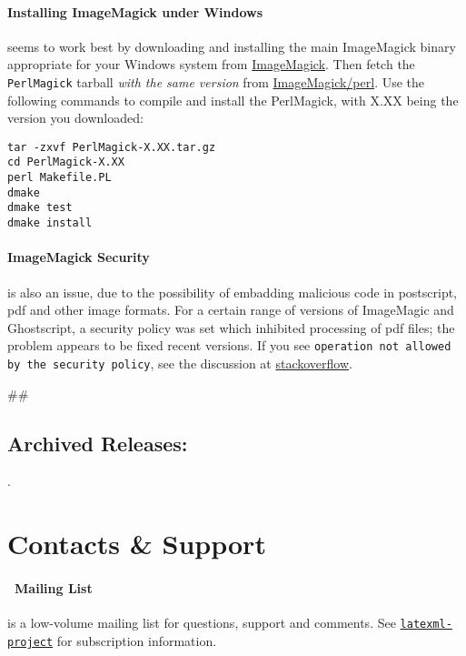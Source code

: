 \documentclass{article}
\begin{document}
\paragraph*{Installing ImageMagick under Windows}\label{get.windows.imagemagick}
seems to work best by downloading and installing the main ImageMagick binary
appropriate for your Windows system
from \href{https://imagemagick.org/script/binary-releases.php#windows}{ImageMagick}.
Then fetch the \texttt{PerlMagick} tarball \emph{with the same version} from
\href{https://imagemagick.com/download/perl/}{ImageMagick/perl}.
Use the following commands to compile and install the PerlMagick,
with X.XX being the version you downloaded:
\begin{lstlisting}[style=shell]
tar -zxvf PerlMagick-X.XX.tar.gz
cd PerlMagick-X.XX
perl Makefile.PL
dmake
dmake test
dmake install
\end{lstlisting}

\paragraph*{ImageMagick Security} is also an issue, due to the possibility of embadding
malicious code in postscript, pdf and other image formats.
For a certain range of versions of ImageMagic and Ghostscript, a security policy was set
which inhibited processing of pdf files; the problem appears to be fixed recent versions.
If you see \texttt{operation not allowed by the security policy}, see the discussion
at \href{https://stackoverflow.com/a/53180170}{stackoverflow}.

\expandafter\ifx\expandafter#\AllReleases#\else
\subsection{Archived Releases:}\label{get.archive}
\AllReleases.
\fi
\section{Contacts \& Support}\label{contact}

\paragraph{\LaTeXML\ Mailing List}\label{contact.list}
is a low-volume mailing list for questions, support and comments.
See \href{https://lists.informatik.uni-erlangen.de/mailman/listinfo/latexml}{\texttt{latexml-project}} for subscription information.
\end{document}

